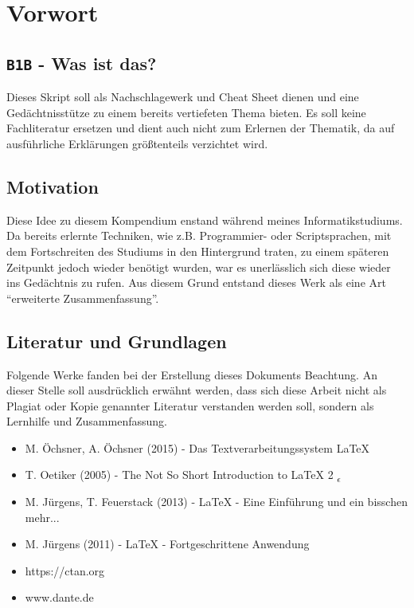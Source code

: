 \chapter{Vorwort}
\section{\texttt{B1B} - Was ist das?}
Dieses Skript soll als Nachschlagewerk und Cheat Sheet dienen und eine Gedächtnisstütze zu einem bereits vertiefeten Thema bieten. Es soll keine Fachliteratur ersetzen und dient auch nicht zum Erlernen der Thematik, da auf ausführliche Erklärungen größtenteils verzichtet wird.
\section{Motivation}
Diese Idee zu diesem Kompendium enstand während meines Informatikstudiums. Da bereits erlernte Techniken, wie z.B. Programmier- oder Scriptsprachen, mit dem Fortschreiten des Studiums in den Hintergrund traten, zu einem späteren Zeitpunkt jedoch wieder benötigt wurden, war es unerlässlich sich diese wieder ins Gedächtnis zu rufen. Aus diesem Grund entstand dieses Werk als eine Art ``erweiterte Zusammenfassung''.
\section{Literatur und Grundlagen}
Folgende Werke fanden bei der Erstellung dieses Dokuments Beachtung. An dieser Stelle soll ausdrücklich erwähnt werden, dass sich diese Arbeit nicht als Plagiat oder Kopie genannter Literatur verstanden werden soll, sondern als Lernhilfe und Zusammenfassung.
\begin{itemize}
\item M. Öchsner, A. Öchsner (2015) - Das Textverarbeitungssystem LaTeX
\item T. Oetiker (2005) - The Not So Short Introduction to \LaTeX{} 2 \textsubscript{$\epsilon$}
\item M. Jürgens, T. Feuerstack (2013) - \LaTeX{} - Eine Einführung und ein bisschen mehr...
\item M. Jürgens (2011) - \LaTeX{} - Fortgeschrittene Anwendung
\item https://ctan.org
\item www.dante.de
\end{itemize}
